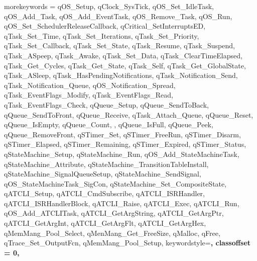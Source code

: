 {    morekeywords = {qOS_Setup, qClock_SysTick, qOS_Set_IdleTask, qOS_Add_Task, qOS_Add_EventTask, qOS_Remove_Task, qOS_Run, qOS_Set_SchedulerReleaseCallback, qCritical_SetInterruptsED, qTask_Set_Time, qTask_Set_Iterations, qTask_Set_Priority, qTask_Set_Callback, qTask_Set_State, qTask_Resume, qTask_Suspend, qTask_ASpeep, qTask_Awake, qTask_Set_Data, qTask_ClearTimeElapsed, qTask_Get_Cycles, qTask_Get_State, qTask_Self, qTask_Get_GlobalState, qTask_ASleep, qTask_HasPendingNotifications, qTask_Notification_Send, qTask_Notification_Queue, qOS_Notification_Spread, qTask_EventFlags_Modify, qTask_EventFlags_Read, qTask_EventFlags_Check, qQueue_Setup, qQueue_SendToBack, qQueue_SendToFront, qQueue_Receive, qTask_Attach_Queue, qQueue_Reset, qQueue_IsEmpty, qQueue_Count, , qQueue_IsFull, qQueue_Peek, qQueue_RemoveFront, qSTimer_Set, qSTimer_FreeRun, qSTimer_Disarm, qSTimer_Elapsed, qSTimer_Remaining, qSTimer_Expired, qSTimer_Status, qStateMachine_Setup, qStateMachine_Run, qOS_Add_StateMachineTask, qStateMachine_Attribute, qStateMachine_TransitionTableInstall, qStateMachine_SignalQueueSetup, qStateMachine_SendSignal, qOS_StateMachineTask_SigCon, qStateMachine_Set_CompositeState, qATCLI_Setup, qATCLI_CmdSubscribe, qATCLI_ISRHandler, qATCLI_ISRHandlerBlock, qATCLI_Raise, qATCLI_Exec, qATCLI_Run, qOS_Add_ATCLITask, qATCLI_GetArgString, qATCLI_GetArgPtr, qATCLI_GetArgInt, qATCLI_GetArgFlt, qATCLI_GetArgHex, qMemMang_Pool_Select, qMenMang_Get_FreeSize, qMalloc, qFree, qTrace_Set_OutputFcn, qMemMang_Pool_Setup},
    keywordstyle=\bfseries,
    classoffset = 0,
}
